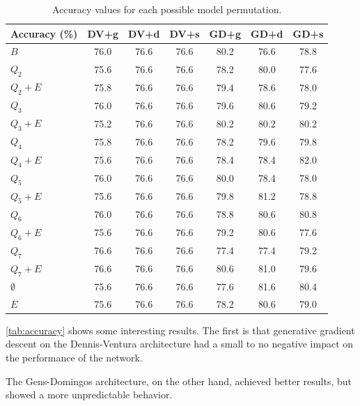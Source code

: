 \begin{table}[h]
  \centering
  \begin{tabular}{l|c|c|c|c|c|c}
    \hline
    \multicolumn{1}{c}{\bfseries Accuracy (\%)} & \multicolumn{1}{c}{\bfseries DV+g} &
    \multicolumn{1}{c}{\bfseries DV+d} & \multicolumn{1}{c}{\bfseries DV+s} &
    \multicolumn{1}{c}{\bfseries GD+g} & \multicolumn{1}{c}{\bfseries GD+d} &
    \multicolumn{1}{c}{\bfseries GD+s}\\
    \hline
    $B$         & 76.0 & 76.6 & 76.6 & 80.2 & 76.6 & 78.8\\
    $Q_2$       & 75.6 & 76.6 & 76.6 & 78.2 & 80.0 & 77.6\\
    $Q_2+E$     & 75.8 & 76.6 & 76.6 & 79.4 & 78.6 & 78.0\\
    $Q_3$       & 76.0 & 76.6 & 76.6 & 79.6 & 80.6 & 79.2\\
    $Q_3+E$     & 75.2 & 76.6 & 76.6 & 80.2 & 80.2 & 80.2\\
    $Q_4$       & 75.8 & 76.6 & 76.6 & 78.2 & 79.6 & 79.8\\
    $Q_4+E$     & 75.6 & 76.6 & 76.6 & 78.4 & 78.4 & 82.0\\
    $Q_5$       & 76.0 & 76.6 & 76.6 & 80.0 & 78.4 & 78.0\\
    $Q_5+E$     & 75.6 & 76.6 & 76.6 & 79.8 & 81.2 & 78.8\\
    $Q_6$       & 76.0 & 76.6 & 76.6 & 78.8 & 80.6 & 80.8\\
    $Q_6+E$     & 75.6 & 76.6 & 76.6 & 79.2 & 80.6 & 77.6\\
    $Q_7$       & 76.6 & 76.6 & 76.6 & 77.4 & 77.4 & 79.2\\
    $Q_7+E$     & 76.6 & 76.6 & 76.6 & 80.6 & 81.0 & 79.6\\
    $\emptyset$ & 75.6 & 76.6 & 76.6 & 77.6 & 81.6 & 80.4\\
    $E$         & 75.6 & 76.6 & 76.6 & 78.2 & 80.6 & 79.0\\
  \end{tabular}
  \caption{Accuracy values for each possible model permutation.\label{tab:accuracy}}
\end{table}

\autoref{tab:accuracy} shows some interesting results. The first is that generative gradient
descent on the Dennis-Ventura architecture had a small to no negative impact on the performance of
the network.

The Gens-Domingos architecture, on the other hand, achieved better results, but showed a more
unpredictable behavior.

